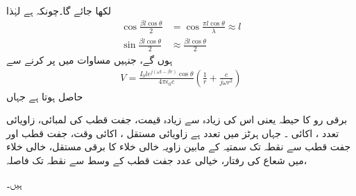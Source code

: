 لکھا جائے گا۔چونکہ  ہے لہٰذا 
\begin{align*}
\cos \frac{\beta l \cos \theta}{2}&=\cos \frac{\pi l \cos \theta}{\lambda}\approx l\\
\sin \frac{\beta l \cos \theta}{2}&\approx \frac{\beta l \cos \theta}{2}
\end{align*}
ہوں گے، جنہیں مساوات  میں پر کرنے سے
\begin{align}\label{مساوات_اینٹینا_غیر_سمتی_دباو_ت}
V=\frac{I_0 l e^{j(\omega t -\beta r)} \cos \theta}{4\pi \epsilon_0 c}\left(\frac{1}{r}+\frac{c}{j\omega r^2} \right)
\end{align}
حاصل ہوتا ہے جہاں
\begin{description}
 برقی رو کا حیطہ یعنی اس کی زیادہ سے زیادہ قیمت، 
 جفت قطب کی لمبائی، 
  زاویائی تعدد  ، اکائی ۔ جہاں ہرٹز میں تعدد  ہے
 زاویائی مستقل ، اکائی 
وقت، 
جفت قطب اور جفت قطب سے نقطہ  تک سمتیہ کے مابین زاویہ
خالی خلاء کا برقی مستقل، 
خالی خلاء میں شعاع کی رفتار، 
خیالی عدد 
جفت قطب کے وسط سے نقطہ  تک فاصلہ،
\end{description}
ہیں۔

